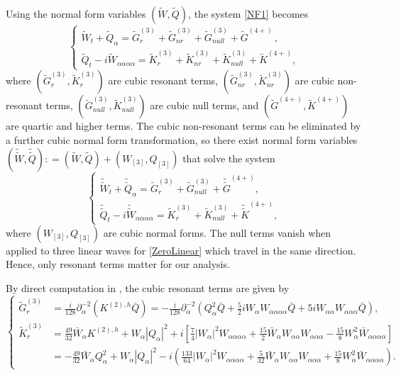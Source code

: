 \documentclass[12pt]{amsart}
\theoremstyle{remark}
\theoremstyle{definition}
\numberwithin{equation}{section}
\newcommand{\p}{\partial}
\newcommand{\al}{\alpha}
\newcommand{\f}{\frac}
\begin{document}
Using the normal form variables $(\tilde{W}, \tilde{Q})$, the system \eqref{NF1} becomes 
\begin{equation*}
\begin{cases}		\tilde{W}_t+\tilde{Q}_{\al}=\tilde{G}_r^{(3)}+ \tilde{G}_{nr}^{(3)}+\tilde{G}_{null}^{(3)}+ \tilde{G}^{(4+)}\,,\\
\tilde{Q}_t-i\tilde{W}_{\al\al\al\al}= \tilde{K}_r^{(3)}+ \tilde{K}_{nr}^{(3)}+  \tilde{K}_{null}^{(3)}+ \tilde{K}^{(4+)},
		\end{cases}
\end{equation*}
where $(\tilde{G}_r^{(3)}, \tilde{K}_r^{(3)})$ are cubic resonant terms, $(\tilde{G}_{nr}^{(3)}, \tilde{K}_{nr}^{(3)})$ are cubic non-resonant terms, $(\tilde{G}_{null}^{(3)}, \tilde{K}_{null}^{(3)})$ are cubic null terms, and $(\tilde{G}^{(4+)}, \tilde{K}^{(4+)})$ are quartic and higher terms.
The cubic non-resonant terms can be eliminated by a further cubic normal form transformation, so there exist normal form variables $(\tilde{\tilde{W}}, \tilde{\tilde{Q}}): = (\tilde{W}, \tilde{Q}) + (W_{[3]}, Q_{[3]})$ that solve the system
\begin{equation}\label{NF4}
\begin{cases}		\tilde{\tilde{W}}_t+\tilde{\tilde{Q}}_{\al}=\tilde{G}_r^{(3)}+\tilde{G}_{null}^{(3)}+ \tilde{\tilde{G}}^{(4+)},\\
\tilde{\tilde{Q}}_t-i\tilde{\tilde{W}}_{\al\al\al\al}= \tilde{K}_r^{(3)}+  \tilde{K}_{null}^{(3)}+ \tilde{\tilde{K}}^{(4+)},
		\end{cases}
\end{equation}
where $(W_{[3]}, Q_{[3]})$ are cubic normal forms.
The null terms vanish when applied to three linear waves for \eqref{ZeroLinear} which travel in the same direction.
Hence, only resonant terms matter for our analysis.

By direct computation in \cite{MR4846707}, the cubic resonant terms are given by
\begin{equation*}
\begin{cases}
\tilde{G}_{r}^{(3)}&=\f{i}{128}\p_\al^{-2}(K^{(2),h}\bar{Q})=-\f{i}{128}\p_\al^{-2}\left(Q_{\al}^2\bar{Q}+\f52iW_\al W_{\al\al\al\al}\bar{Q}+5iW_{\al\al}W_{\al\al\al}\bar{Q}\right), \\
\tilde{K}_r^{(3)}&=\f{49}{32}\bar{W}_{\al}K^{(2),h}+W_{\al}|Q_{\al}|^2
+i\left[\f74|W_{\al}|^2W_{\al\al\al\al}+\f{15}{2}\bar{W}_{\al}W_{\al\al}W_{\al\al\al}-\f{15}{8}W^2_{\al}\bar{W}_{\al\al\al\al}\right]\\
&=-\f{49}{32}\bar{W}_{\al}Q_{\al}^2+W_{\al}|Q_{\al}|^2-i\left(\f{133}{64}|W_{\al}|^2W_{\al\al\al\al}+\f{5}{32} \bar{W}_{\al}W_{\al\al}W_{\al\al\al}+\f{15}{8}W^2_{\al}\bar{W}_{\al\al\al\al}\right).
\end{cases}
\end{equation*}
\end{document}
